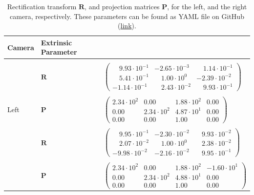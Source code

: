 \begin{table}
	\centering
	\begin{tabular}{lll}
		Camera & Extrinsic Parameter & \\ 
		\hline
		&& \\
		\multirow{5}{*}{Left} & $\bm{R}$              & $\begin{pmatrix}
		\quad9.93\cdot10^{-1} & -2.65\cdot10^{-3}     & \quad1.14\cdot10^{-1} \\ 
		\quad5.41\cdot10^{-1} & \quad1.00\cdot10^{0}  & -2.39\cdot10^{-2} \\
		-1.14\cdot10^{-1}     & \quad2.43\cdot10^{-2} & \quad9.93\cdot10^{-1}
		\end{pmatrix}$ \\&&\\
		                      & $\bm{P}$              & $\begin{pmatrix}
        2.34\cdot10^{2} & 0.00     & 1.88\cdot10^{2} & 0.00 \\ 
        0.00 & 2.34\cdot10^{2}  & 4.87\cdot10^{1} & 0.00 \\
        0.00    & 0.00 & 1.00 & 0.00
        \end{pmatrix}$ \\
        &&\\
        \multirow{5}{*}{Right} & $\bm{R}$              & $\begin{pmatrix}
        \quad9.95\cdot10^{-1} & -2.30\cdot10^{-2}     & \quad9.93\cdot10^{-2} \\ 
        \quad2.07\cdot10^{-2} & \quad1.00\cdot10^{0}  & \quad2.38\cdot10^{-2} \\
        -9.98\cdot10^{-2}     & -2.16\cdot10^{-2} & \quad9.95\cdot10^{-1}
        \end{pmatrix}$ \\&&\\
        & $\bm{P}$              & $\begin{pmatrix}
        2.34\cdot10^{2} & 0.00     & 1.88\cdot10^{2} & -1.60\cdot10^1 \\ 
        0.00 & 2.34\cdot10^{2}  & 4.88\cdot10^{1} & 0.00 \\
        0.00    & 0.00 & 1.00 & 0.00
        \end{pmatrix}$ \\
	\end{tabular}
	\caption{Rectification transform $\bm{R}$, and projection matrices $\bm{P}$, for the left, and the right camera, respectively. These parameters can be found as YAML file on GitHub (\href{https://github.com/mhubii/nmpc_pattern_generator/blob/master/libs/io_module/cam_stereo.yaml}{link}). \label{tab::51_extrinsics}}
\end{table}
